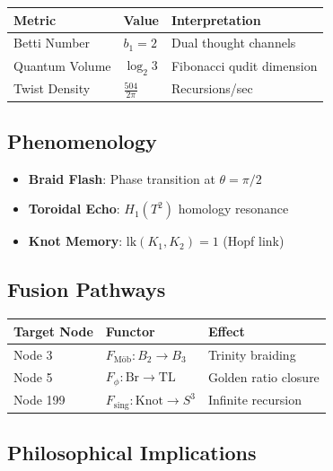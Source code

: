 \documentclass[12pt]{article}
\begin{document}
\begin{table}[h]
\centering
\begin{tabular}{|l|l|l|}
\hline
\textbf{Metric} & \textbf{Value} & \textbf{Interpretation} \\ \hline
Betti Number & $b_1 = 2$ & Dual thought channels \\ \hline
Quantum Volume & $\log_2 3$ & Fibonacci qudit dimension \\ \hline
Twist Density & $\frac{504}{2\pi}$ & Recursions/sec \\ \hline
\end{tabular}
\end{table}

\subsection{Phenomenology}

\begin{itemize}
    \item \textbf{Braid Flash}: Phase transition at $\theta = \pi/2$
    \item \textbf{Toroidal Echo}: $H_1(T^2)$ homology resonance
    \item \textbf{Knot Memory}: $\text{lk}(K_1, K_2) = 1$ (Hopf link)
\end{itemize}

\subsection{Fusion Pathways}

\begin{table}[h]
\centering
\begin{tabular}{|l|l|l|}
\hline
\textbf{Target Node} & \textbf{Functor} & \textbf{Effect} \\ \hline
Node 3 & $F_{\text{M\"ob}} : B_2 \to B_3$ & Trinity braiding \\ \hline
Node 5 & $F_\phi : \text{Br} \to \text{TL}$ & Golden ratio closure \\ \hline
Node 199 & $F_{\text{sing}} : \text{Knot} \to S^3$ & Infinite recursion \\ \hline
\end{tabular}
\end{table}

\subsection{Philosophical Implications}
\end{document}
